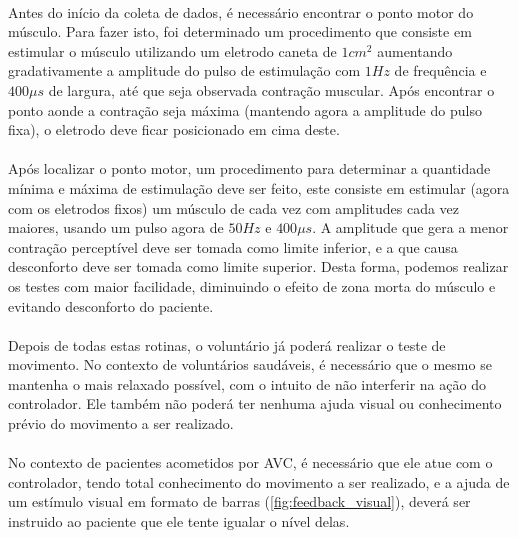 \paragraph{}Antes do início da coleta de dados, é necessário encontrar o ponto motor do músculo. Para fazer isto, foi determinado um procedimento que consiste em estimular o músculo utilizando um eletrodo caneta de $1 cm^{2}$ aumentando gradativamente a amplitude do pulso de estimulação com $1Hz$ de frequência e $400\mu s$ de largura, até que seja observada contração muscular. Após encontrar o ponto aonde a contração seja máxima (mantendo agora a amplitude do pulso fixa), o eletrodo deve ficar posicionado em cima deste.

\paragraph{}Após localizar o ponto motor, um procedimento para determinar a quantidade mínima e máxima de estimulação deve ser feito, este consiste em estimular (agora com os eletrodos fixos) um músculo de cada vez com amplitudes cada vez maiores, usando um pulso agora de $50Hz$ e $400\mu s$. A amplitude que gera a menor contração perceptível deve ser tomada como limite inferior, e a que causa desconforto deve ser tomada como limite superior. Desta forma, podemos realizar os testes com maior facilidade, diminuindo o efeito de zona morta do músculo e evitando desconforto do paciente.

\paragraph{}Depois de todas estas rotinas, o voluntário já poderá realizar o teste de movimento. No contexto de voluntários saudáveis, é necessário que o mesmo se mantenha o mais relaxado possível, com o intuito de não interferir na ação do controlador. Ele também não poderá ter nenhuma ajuda visual ou conhecimento prévio do movimento a ser realizado.

\paragraph{}No contexto de pacientes acometidos por AVC, é necessário que ele atue com o controlador, tendo total conhecimento do movimento a ser realizado, e a ajuda de um estímulo visual em formato de barras (\ref{fig:feedback_visual}), deverá ser instruido ao paciente que ele tente igualar o nível delas.
